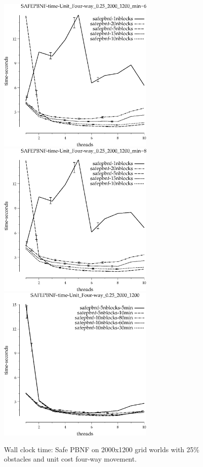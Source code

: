 \documentclass{article}
\begin{document}
\begin{appendices}
\begin{figure}[h]
\begin{center}
\includegraphics[width=3in]{../graphs/grid_unit_four-way_0.25_2000_1200/SAFEPBNF-time-Unit_Four-way_0.25_2000_1200_min=60.eps}
\includegraphics[width=3in]{../graphs/grid_unit_four-way_0.25_2000_1200/SAFEPBNF-time-Unit_Four-way_0.25_2000_1200_min=80.eps}
\includegraphics[width=3in]{../graphs/grid_unit_four-way_0.25_2000_1200/SAFEPBNF-time-Unit_Four-way_0.25_2000_1200.eps}
\caption{Wall clock time: Safe PBNF on 2000x1200 grid worlds with 25\%
  obstacles and unit cost four-way movement.}
\end{center}
\end{figure}


\end{appendices}
\end{document}
